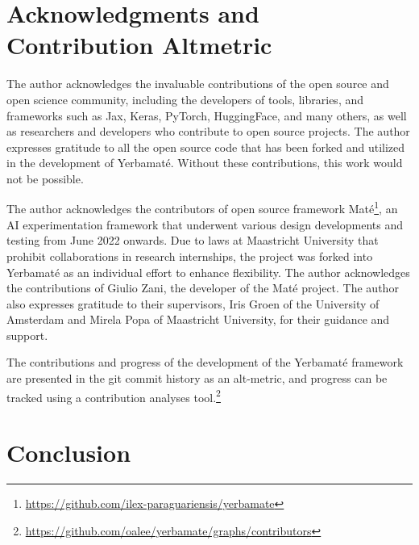 

\section{Acknowledgments and Contribution Alt\-metric}

The author acknowledges the invaluable contributions of the open source and open science community, including the developers of tools, libraries, and frameworks such as Jax, Keras, PyTorch, HuggingFace, and many others, as well as researchers and developers who contribute to open source projects. The author expresses gratitude to all the open source code that has been forked and utilized in the development of Yerbamaté. Without these contributions, this work would not be possible.


The author acknowledges the contributors of open source framework Maté\footnote{\url{https://github.com/ilex-paraguariensis/yerbamate}}, an AI experimentation framework that underwent various design developments and testing from June 2022 onwards. Due to laws at Maastricht University that prohibit collaborations in research internships, the project was forked into Yerbamaté as an individual effort to enhance flexibility. The author acknowledges the contributions of Giulio Zani, the developer of the Maté project.
The author also expresses gratitude to their supervisors, Iris Groen of the University of Amsterdam and Mirela Popa of Maastricht University, for their guidance and support. 


The contributions and progress of the development of the Yerbamaté framework are presented in the git commit history as an alt-metric, and progress can be tracked using a contribution analyses tool.\footnote{\url{https://github.com/oalee/yerbamate/graphs/contributors}}



\section{Conclusion}





